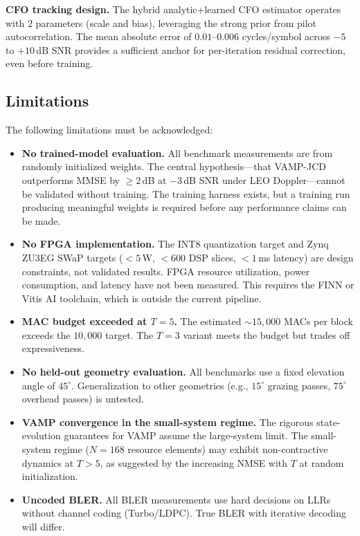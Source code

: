\documentclass{article}
\begin{document}
\textbf{CFO tracking design.} The hybrid analytic+learned CFO estimator operates with 2 parameters (scale and bias), leveraging the strong prior from pilot autocorrelation. The mean absolute error of $0.01$--$0.006$ cycles/symbol across $-5$ to $+10$\,dB SNR provides a sufficient anchor for per-iteration residual correction, even before training. %

\subsection{Limitations}
\label{sec:limitations}

The following limitations must be acknowledged:

\begin{itemize}
  \item \textbf{No trained-model evaluation.} All benchmark measurements are from randomly initialized weights. The central hypothesis---that VAMP-JCD outperforms MMSE by $\geq 2$\,dB at $-3$\,dB SNR under LEO Doppler---cannot be validated without training. The training harness exists, but a training run producing meaningful weights is required before any performance claims can be made.
  \item \textbf{No FPGA implementation.} The INT8 quantization target and Zynq ZU3EG SWaP targets ($<5$\,W, $<600$ DSP slices, $<1$\,ms latency) are design constraints, not validated results. FPGA resource utilization, power consumption, and latency have not been measured. This requires the FINN or Vitis AI toolchain, which is outside the current pipeline.
  \item \textbf{MAC budget exceeded at $T=5$.} The estimated $\sim 15{,}000$ MACs per block exceeds the $10{,}000$ target. The $T=3$ variant meets the budget but trades off expressiveness.
  \item \textbf{No held-out geometry evaluation.} All benchmarks use a fixed elevation angle of $45^\circ$. Generalization to other geometries (e.g., $15^\circ$ grazing passes, $75^\circ$ overhead passes) is untested.
  \item \textbf{VAMP convergence in the small-system regime.} The rigorous state-evolution guarantees for VAMP assume the large-system limit. The small-system regime ($N=168$ resource elements) may exhibit non-contractive dynamics at $T > 5$, as suggested by the increasing NMSE with $T$ at random initialization.
  \item \textbf{Uncoded BLER.} All BLER measurements use hard decisions on LLRs without channel coding (Turbo/LDPC). True BLER with iterative decoding will differ.
\end{itemize}
\end{document}
